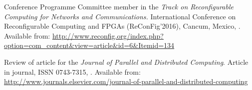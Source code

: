 \renewcommand\bibname{Evaluation Activities}
\begin{thebibliography}{A.9}%
Conference Programme Committee member in the 
\textit{Track on Reconfigurable Computing for Networks and Communications.}
\newblock International Conference on Reconfigurable Computing and FPGAs (ReConFig'2016), Cancum, Mexico,
.
\newblock Available from: \url{http://www.reconfig.org/index.php?option=com\_content&view=article&id=6&Itemid=134}

Review of article for the \textit{Journal of Parallel and Distributed Computing}. 
\newblock Article in journal, ISSN 0743-7315,
.
\newblock Available from: \url{http://www.journals.elsevier.com/journal-of-parallel-and-distributed-computing}

\end{thebibliography}
